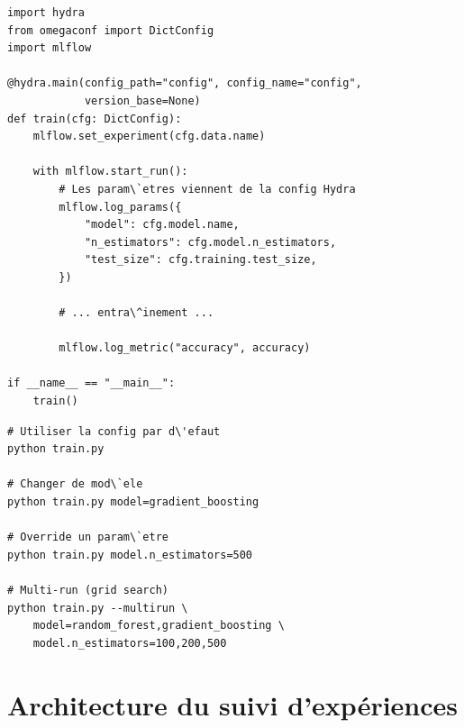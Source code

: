\begin{codeblock}[title=\textbf{Utilisation de Hydra avec MLflow}]
\begin{verbatim}
import hydra
from omegaconf import DictConfig
import mlflow

@hydra.main(config_path="config", config_name="config",
            version_base=None)
def train(cfg: DictConfig):
    mlflow.set_experiment(cfg.data.name)

    with mlflow.start_run():
        # Les param\`etres viennent de la config Hydra
        mlflow.log_params({
            "model": cfg.model.name,
            "n_estimators": cfg.model.n_estimators,
            "test_size": cfg.training.test_size,
        })

        # ... entra\^inement ...

        mlflow.log_metric("accuracy", accuracy)

if __name__ == "__main__":
    train()
\end{verbatim}
\end{codeblock}

\begin{codeblock}[title=\textbf{Override de configuration en ligne de commande}]
\begin{verbatim}
# Utiliser la config par d\'efaut
python train.py

# Changer de mod\`ele
python train.py model=gradient_boosting

# Override un param\`etre
python train.py model.n_estimators=500

# Multi-run (grid search)
python train.py --multirun \
    model=random_forest,gradient_boosting \
    model.n_estimators=100,200,500
\end{verbatim}
\end{codeblock}

\section{Architecture du suivi d'exp\'eriences}
\label{sec:tracking-architecture}

